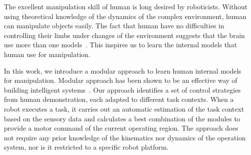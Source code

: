 %



The excellent manipulation skill of human is long desired by roboticists. Without using theoretical knowledge of the dynamics of the complex environment, human can manipulate objects easily. The fact that human have no difficulties in controlling their limbs under changes of the environment suggests that the brain use more than one models~\cite{haruno2001mosaic}. This inspires us to learn the internal models that human use for manipulation.

In this work, we introduce a modular approach to learn human internal models for manipulation. Modular approach has been shown to be an effective way of building intelligent systems~\cite{bryson2004modular,BrysonMcG12}. Our approach identifies a set of control strategies from human demonstration, each adapted to different task contexts. When a robot executes a task, it carries out an automatic estimation of the task context based on the sensory data and calculates a best combination of the modules to provide a motor command of the current operating region. The approach does not require any prior knowledge of the kinematics nor dynamics of the operation system, nor is it restricted to a specific robot platform. %

